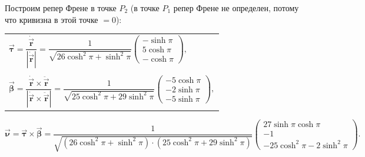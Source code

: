 \documentclass[12pt,a4paper]{article}
\newcommand{\boldVec}[1]{\vec{\mathbf #1}}
\newcommand{\vectorProduct}[2]{\boldVec #1 \times \boldVec #2}
\begin{document}
    Построим репер Френе в точке $ P_2 $ (в точке $ P_1$ репер Френе не определен, потому что кривизна в этой точке $ = 0$):
    \begin{table}[h!]
        \centering
        \begin{tabular}{l}
            $
                \boldVec{\tau} = \dfrac{\dot{\boldVec{r}}}{|\dot{\boldVec{r}}|} = \dfrac{1}{\sqrt{26 \cosh^2 \pi + \sinh^2 \pi}} 
                    \begin{pmatrix}
                        -\sinh \pi 
                        \\
                        5 \cosh \pi
                        \\
                        -\cosh \pi
                    \end{pmatrix}\!,
            $
            \\ \\ 
            $
                \boldVec{\beta} = \dfrac{\dot{\boldVec r} \times \ddot{\boldVec r}}{ | \dot{\boldVec r} \times \ddot{\boldVec r} |} = \dfrac{1}{\sqrt{25\cosh^2 \pi + 29\sinh^2 \pi}} 
                    \begin{pmatrix}
                        -5\cosh \pi 
                        \\
                        -2\sinh \pi
                        \\
                        -5\sinh \pi 
                    \end{pmatrix}\!,
            $
        \end{tabular}
    \end{table}
    \[
        \boldVec{\nu} = \vectorProduct{\tau}{\beta} = \dfrac{1}{\sqrt{(26 \cosh^2 \pi + \sinh^2 \pi) \cdot (25\cosh^2 \pi + 29\sinh^2 \pi)}}
            \begin{pmatrix}
                27 \sinh \pi \cosh \pi
                \\
                -1
                \\
                -25 \cosh^2 \pi - 2\sinh^2 \pi
            \end{pmatrix}\!.
    \]
\end{document}
